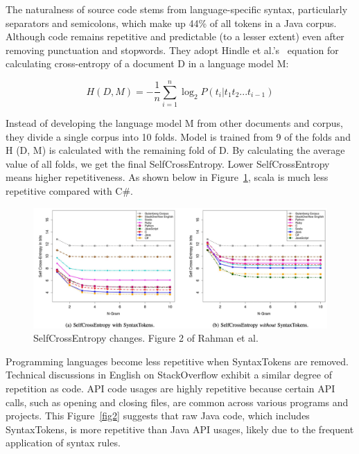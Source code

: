 \documentclass[runningheads]{llncs}
\begin{document}
The naturalness of source code stems from language-specific syntax, particularly separators and semicolons, which make up 44\% of all tokens in a Java corpus. Although code remains repetitive and predictable (to a lesser extent) even after removing punctuation and stopwords. They adopt Hindle et al.’s~\cite{ref_hindle2012} equation for calculating cross-entropy of a document D in a language model M:

\begin{equation}
    H(D, M) = -\frac{1}{n} \sum_{i=1}^{n} \log_2 P(t_i | t_{1}t_{2}...t_{i-1})
\end{equation}

Instead of developing the language model M from other documents and corpus, they divide a single corpus into 10 folds. Model is trained from 9 of the folds and H (D, M) is calculated with the remaining fold of D. By calculating the average value of all folds, we get the final SelfCrossEntropy. Lower SelfCrossEntropy means higher repetitiveness. As shown below in Figure~\ref{fig1}, scala is much less repetitive compared with C\#. 

\begin{figure}[h]
\centering
    \includegraphics[width=\textwidth]{fig1}
    \caption{SelfCrossEntropy changes. Figure 2 of Rahman et al.\cite{0_ref_proc1}}\label{fig1}
\end{figure}

Programming languages become less repetitive when SyntaxTokens are removed. Technical discussions in English on StackOverflow exhibit a similar degree of repetition as code.
API code usages are highly repetitive because certain API calls, such as opening and closing files, are common across various programs and projects. This Figure~\ref{fig2} suggests 
that raw Java code, which includes SyntaxTokens, is more repetitive than Java API 
usages, likely due to the frequent application of syntax rules.
\end{document}
